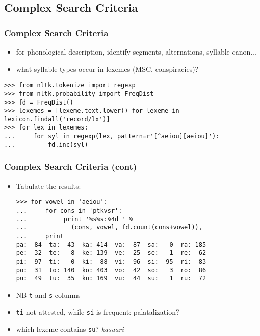 \documentclass{beamer}             %
\begin{document}
\subsection{Complex Search Criteria}

\begin{frame}[fragile]
\frametitle{Complex Search Criteria}
\begin{itemize}
\item for phonological description, identify segments, alternations,
  syllable canon...
\item what syllable types occur in lexemes (MSC, conspiracies)?
\end{itemize}

\scriptsize
\begin{verbatim}
>>> from nltk.tokenize import regexp
>>> from nltk.probability import FreqDist
>>> fd = FreqDist()
>>> lexemes = [lexeme.text.lower() for lexeme in lexicon.findall('record/lx')]
>>> for lex in lexemes:
...     for syl in regexp(lex, pattern=r'[^aeiou][aeiou]'):
...         fd.inc(syl)
\end{verbatim}
\end{frame}

\begin{frame}[fragile]
\frametitle{Complex Search Criteria (cont)}

\begin{itemize}
\item Tabulate the results:

\scriptsize
\begin{verbatim}
>>> for vowel in 'aeiou':
...     for cons in 'ptkvsr':
...          print '%s%s:%4d ' %
...            (cons, vowel, fd.count(cons+vowel)),
...     print
pa:  84  ta:  43  ka: 414  va:  87  sa:   0  ra: 185 
pe:  32  te:   8  ke: 139  ve:  25  se:   1  re:  62 
pi:  97  ti:   0  ki:  88  vi:  96  si:  95  ri:  83 
po:  31  to: 140  ko: 403  vo:  42  so:   3  ro:  86 
pu:  49  tu:  35  ku: 169  vu:  44  su:   1  ru:  72 
\end{verbatim}

\small
\item NB \texttt{t} and \texttt{s} columns
\item \texttt{ti} not attested, while \texttt{si} is frequent: palatalization?
\item which lexeme contains \texttt{su}?  \textit{kasuari}
\end{itemize}
\end{frame}
\end{document}
